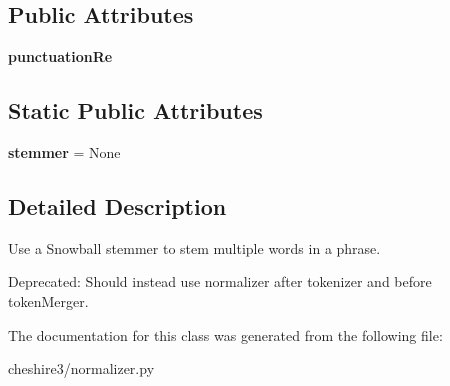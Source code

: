 \subsection*{Public Attributes}
\begin{DoxyCompactItemize}
\item 
\hypertarget{classcheshire3_1_1normalizer_1_1_phrase_stem_normalizer_a12c89be82e56cc61d9d31c6ab1b5aaf4}{{\bfseries punctuation\-Re}}\label{classcheshire3_1_1normalizer_1_1_phrase_stem_normalizer_a12c89be82e56cc61d9d31c6ab1b5aaf4}

\end{DoxyCompactItemize}
\subsection*{Static Public Attributes}
\begin{DoxyCompactItemize}
\item 
\hypertarget{classcheshire3_1_1normalizer_1_1_phrase_stem_normalizer_a3da36ab4f6e0bb9e03438a727290eb5f}{{\bfseries stemmer} = None}\label{classcheshire3_1_1normalizer_1_1_phrase_stem_normalizer_a3da36ab4f6e0bb9e03438a727290eb5f}

\end{DoxyCompactItemize}


\subsection{Detailed Description}
\begin{DoxyVerb}Use a Snowball stemmer to stem multiple words in a phrase.

Deprecated: Should instead use normalizer after tokenizer and before
tokenMerger.
\end{DoxyVerb}
 

The documentation for this class was generated from the following file\-:\begin{DoxyCompactItemize}
\item 
cheshire3/normalizer.\-py\end{DoxyCompactItemize}
